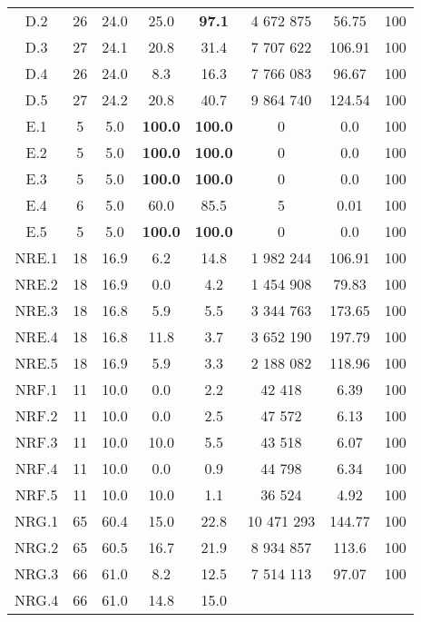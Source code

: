 \begin{longtable}{@{\extracolsep{5pt}}cccccccc}
	D.2
	&
	26
	&
	24.0
	&
	25.0
	&
	\textbf{97.1}
	&
	4 672 875
	&
	56.75
	&
	100
	\\
	D.3
	&
	27
	&
	24.1
	&
	20.8
	&
	31.4
	&
	7 707 622
	&
	106.91
	&
	100
	\\
	D.4
	&
	26
	&
	24.0
	&
	8.3
	&
	16.3
	&
	7 766 083
	&
	96.67
	&
	100
	\\
	D.5
	&
	27
	&
	24.2
	&
	20.8
	&
	40.7
	&
	9 864 740
	&
	124.54
	&
	100
	\\
	E.1
	&
	5
	&
	5.0
	&
	\textbf{100.0}
	&
	\textbf{100.0}
	&
	0
	&
	0.0
	&
	100
	\\
	E.2
	&
	5
	&
	5.0
	&
	\textbf{100.0}
	&
	\textbf{100.0}
	&
	0
	&
	0.0
	&
	100
	\\
	E.3
	&
	5
	&
	5.0
	&
	\textbf{100.0}
	&
	\textbf{100.0}
	&
	0
	&
	0.0
	&
	100
	\\
	E.4
	&
	6
	&
	5.0
	&
	60.0
	&
	85.5
	&
	5
	&
	0.01
	&
	100
	\\
	E.5
	&
	5
	&
	5.0
	&
	\textbf{100.0}
	&
	\textbf{100.0}
	&
	0
	&
	0.0
	&
	100
	\\
	NRE.1
	&
	18
	&
	16.9
	&
	6.2
	&
	14.8
	&
	1 982 244
	&
	106.91
	&
	100
	\\
	NRE.2
	&
	18
	&
	16.9
	&
	0.0
	&
	4.2
	&
	1 454 908
	&
	79.83
	&
	100
	\\
	NRE.3
	&
	18
	&
	16.8
	&
	5.9
	&
	5.5
	&
	3 344 763
	&
	173.65
	&
	100
	\\
	NRE.4
	&
	18
	&
	16.8
	&
	11.8
	&
	3.7
	&
	3 652 190
	&
	197.79
	&
	100
	\\
	NRE.5
	&
	18
	&
	16.9
	&
	5.9
	&
	3.3
	&
	2 188 082
	&
	118.96
	&
	100
	\\
	NRF.1
	&
	11
	&
	10.0
	&
	0.0
	&
	2.2
	&
	42 418
	&
	6.39
	&
	100
	\\
	NRF.2
	&
	11
	&
	10.0
	&
	0.0
	&
	2.5
	&
	47 572
	&
	6.13
	&
	100
	\\
	NRF.3
	&
	11
	&
	10.0
	&
	10.0
	&
	5.5
	&
	43 518
	&
	6.07
	&
	100
	\\
	NRF.4
	&
	11
	&
	10.0
	&
	0.0
	&
	0.9
	&
	44 798
	&
	6.34
	&
	100
	\\
	NRF.5
	&
	11
	&
	10.0
	&
	10.0
	&
	1.1
	&
	36 524
	&
	4.92
	&
	100
	\\
	NRG.1
	&
	65
	&
	60.4
	&
	15.0
	&
	22.8
	&
	10 471 293
	&
	144.77
	&
	100
	\\
	NRG.2
	&
	65
	&
	60.5
	&
	16.7
	&
	21.9
	&
	8 934 857
	&
	113.6
	&
	100
	\\
	NRG.3
	&
	66
	&
	61.0
	&
	8.2
	&
	12.5
	&
	7 514 113
	&
	97.07
	&
	100
	\\
	NRG.4
	&
	66
	&
	61.0
	&
	14.8
	&
	15.0
	&

\end{longtable}

